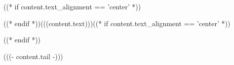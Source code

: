 \noindent ((* if content.text_alignment == 'center' *))\begin{center}((* endif *))(((content.text)))((* if content.text_alignment == 'center' *))\end{center}((* endif *))\par (((- content.tail -)))